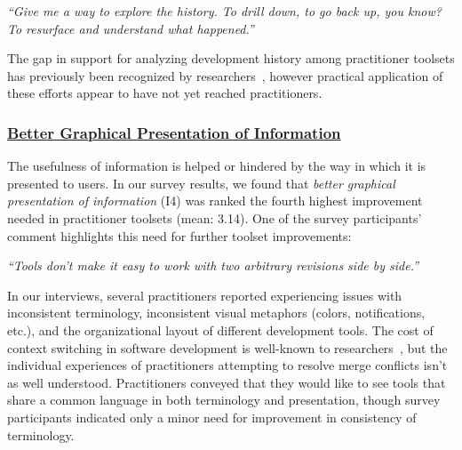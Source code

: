 \begin{displayquote}
\textit{``Give me a way to explore the history. To drill down, to go back up, you know? To resurface and understand what happened.''}
\end{displayquote}

The gap in support for analyzing development history among practitioner toolsets has previously been recognized by researchers~\cite{sun2015informationhistory}\cite{guo2016cold-start}\cite{yan2014miningcontracts}, however practical application of these efforts appear to have not yet reached practitioners.

\subsubsection{\underline{Better Graphical Presentation of Information}}
The usefulness of information is helped or hindered by the way in which it is presented to users.
In our survey results, we found that \textit{better graphical presentation of information} (I4) was ranked the fourth highest improvement needed in practitioner toolsets (mean: 3.14).
One of the survey participants' comment highlights this need for further toolset improvements:
\begin{displayquote}
\textit{``Tools don't make it easy to work with two arbitrary revisions side by side.''}
\end{displayquote}

In our interviews, several practitioners reported experiencing issues with inconsistent terminology, inconsistent visual metaphors (colors, notifications, etc.), and the organizational layout of different development tools.
The cost of context switching in software development is well-known to researchers~\cite{czerwinski2004taskswitching}\cite{li2007cost_of_context_switch}\cite{blackwell2002attentioninvestment}\cite{convertino2003dualview}, but the individual experiences of practitioners attempting to resolve merge conflicts isn't as well understood.
Practitioners conveyed that they would like to see tools that share a common language in both terminology and presentation, though survey participants indicated only a minor need for improvement in consistency of terminology. 

